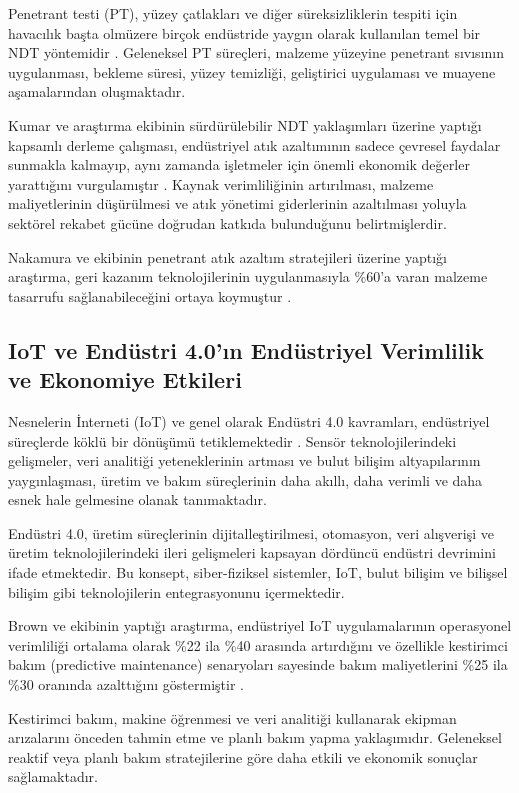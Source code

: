 \documentclass[12pt,a4paper]{article}
\begin{document}
Penetrant testi (PT), yüzey çatlakları ve diğer süreksizliklerin tespiti için havacılık başta olmüzere birçok endüstride yaygın olarak kullanılan temel bir NDT yöntemidir \cite{raj2022practical}. Geleneksel PT süreçleri, malzeme yüzeyine penetrant sıvısının uygulanması, bekleme süresi, yüzey temizliği, geliştirici uygulaması ve muayene aşamalarından oluşmaktadır.

Kumar ve araştırma ekibinin sürdürülebilir NDT yaklaşımları üzerine yaptığı kapsamlı derleme çalışması, endüstriyel atık azaltımının sadece çevresel faydalar sunmakla kalmayıp, aynı zamanda işletmeler için önemli ekonomik değerler yarattığını vurgulamıştır \cite{kumar2021sustainable}. Kaynak verimliliğinin artırılması, malzeme maliyetlerinin düşürülmesi ve atık yönetimi giderlerinin azaltılması yoluyla sektörel rekabet gücüne doğrudan katkıda bulunduğunu belirtmişlerdir.

Nakamura ve ekibinin penetrant atık azaltım stratejileri üzerine yaptığı araştırma, geri kazanım teknolojilerinin uygulanmasıyla \%60'a varan malzeme tasarrufu sağlanabileceğini ortaya koymuştur \cite{nakamura2020penetrant}.

\subsection{IoT ve Endüstri 4.0'ın Endüstriyel Verimlilik ve Ekonomiye Etkileri}

Nesnelerin İnterneti (IoT) ve genel olarak Endüstri 4.0 kavramları, endüstriyel süreçlerde köklü bir dönüşümü tetiklemektedir \cite{schwab2017fourth}. Sensör teknolojilerindeki gelişmeler, veri analitiği yeteneklerinin artması ve bulut bilişim altyapılarının yaygınlaşması, üretim ve bakım süreçlerinin daha akıllı, daha verimli ve daha esnek hale gelmesine olanak tanımaktadır.

Endüstri 4.0, üretim süreçlerinin dijitalleştirilmesi, otomasyon, veri alışverişi ve üretim teknolojilerindeki ileri gelişmeleri kapsayan dördüncü endüstri devrimini ifade etmektedir. Bu konsept, siber-fiziksel sistemler, IoT, bulut bilişim ve bilişsel bilişim gibi teknolojilerin entegrasyonunu içermektedir.

Brown ve ekibinin yaptığı araştırma, endüstriyel IoT uygulamalarının operasyonel verimliliği ortalama olarak \%22 ila \%40 arasında artırdığını ve özellikle kestirimci bakım (predictive maintenance) senaryoları sayesinde bakım maliyetlerini \%25 ila \%30 oranında azalttığını göstermiştir \cite{brown2020iot}.

Kestirimci bakım, makine öğrenmesi ve veri analitiği kullanarak ekipman arızalarını önceden tahmin etme ve planlı bakım yapma yaklaşımıdır. Geleneksel reaktif veya planlı bakım stratejilerine göre daha etkili ve ekonomik sonuçlar sağlamaktadır.
\end{document}
